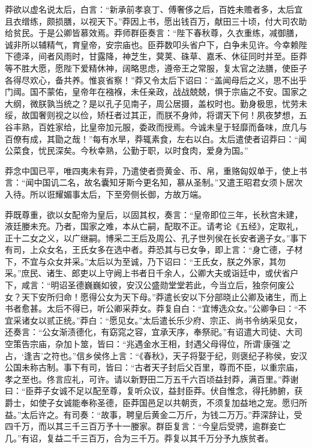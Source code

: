 \documentclass[12pt,UTF8]{ctexbook}
\begin{document}
莽欲以虚名说太后，白言：“新承前孝哀丁、傅奢侈之后，百姓未赡者多，太后宜且衣缯练，颇损膳，以视天下。”莽因上书，愿出钱百万，献田三十顷，付大司农助给贫民。于是公卿皆慕效焉。莽师群臣奏言：“陛下春秋尊，久衣重练，减御膳，诚非所以辅精气，育皇帝，安宗庙也。臣莽数叩头省户下，白争未见许。今幸赖陛下德泽，间者风雨时，甘露降，神芝生，蓂荚、硃草、嘉禾、休征同时并至。臣莽等不胜大愿，愿陛下爱精休神，阔略思虑，遵帝王之常服，复太官之法膳，使臣子各得尽欢心，备共养。惟哀省察！”莽又令太后下诏曰：“盖闻母后之义，思不出乎门阈。国不蒙佑，皇帝年在襁褓，未任亲政，战战兢兢，惧于宗庙之不安。国家之大纲，微朕孰当统之？是以孔子见南子，周公居摄，盖权时也。勤身极思，忧劳未绥，故国奢则视之以俭，矫枉者过其正，而朕不身帅，将谓天下何！夙夜梦想，五谷丰熟，百姓家给，比皇帝加元服，委政而授焉。今诚未皇于轻靡而备味，庶几与百僚有成，其勖之哉！”每有水旱，莽辄素食，左右以白。太后遣使者诏莽曰：“闻公菜食，忧民深矣。今秋幸熟，公勤于职，以时食肉，爱身为国。”



莽念中国已平，唯四夷未有异，乃遣使者赍黄金、币、帛，重赂匈奴单于，使上书言：“闻中国讥二名，故名囊知牙斯今更名知，慕从圣制。”又遣王昭君女须卜居次入待。所以诳耀媚事太后，下至旁侧长御，方故万端。



莽既尊重，欲以女配帝为皇后，以固其权，奏言：“皇帝即位三年，长秋宫未建，液廷媵未充。乃者，国家之难，本从亡嗣，配取不正。请考论《五经》，定取礼，正十二女之义，以广继嗣。博采二王后及周公、孔子世列侯在长安者適子女。”事下有司，上众女名，王氏女多在选中者。莽恐其与已女争，即上言：“身亡德，子材下，不宜与众女并采。”太后以为至诚，乃下诏曰：“王氏女，朕之外家，其勿采。”庶民、诸生、郎吏以上守阙上书者日千余人，公卿大夫或诣廷中，或伏省户下，咸言：“明诏圣德巍巍如彼，安汉公盛勋堂堂若此，今当立后，独奈何废公女？天下安所归命！愿得公女为天下母。”莽遣长安以下分部晓止公卿及诸生，而上书者愈甚。太后不得已，听公卿采莽女。莽复自白：“宜博选众女。”公卿争曰：“不宜采诸女以贰正统。”莽白：“愿见女。”太后遣长乐少府、宗正、尚书令纳采见女，还奏言：“公女渐渍德化，有窈窕之容，宜承天序，奉祭祀。”有诏遣大司徒、大司空策告宗庙，杂加卜筮，皆曰：“兆遇金水王相，封遇父母得位，所谓‘康强’之占，‘逢吉’之符也。”信乡侯佟上言：“《春秋》，天子将娶于纪，则褒纪子称侯，安汉公国未称古制。事下有司，皆曰：“古者天子封后父百里，尊而不臣，以重宗庙，孝之至也。佟言应礼，可许。请以新野田二万五千六百顷益封莽，满百里。”莽谢曰：“臣莽子女诚不足以配至尊，复听众议，益封臣莽。伏自惟念，得托肺腑，获爵士，如使子女诚能奉称圣德，臣莽国邑足以共朝贡，不须复加益地之宠。愿归所益。”太后许之。有司奏：“故事，聘皇后黄金二万斤，为钱二万万。”莽深辞让，受四千万，而以其三千三百万予十一媵家。群臣复言：“今皇后受骋，逾群妾亡几。”有诏，复益二千三百万，合为三千万。莽复以其千万分予九族贫者。
\end{document}
